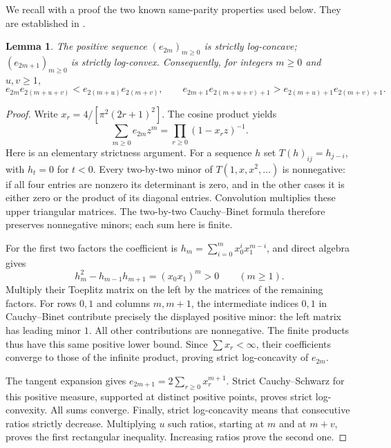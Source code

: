 \documentclass[11pt]{article}
\newtheorem{lemma}{Lemma}
\begin{document}
We recall with a proof the two known same-parity properties used below.
They are established in \cite[Section 3, Proposition 3.2]{Sokal}.
\begin{lemma}\label{same}
The positive sequence $(e_{2m})_{m\ge0}$ is strictly log-concave;
$(e_{2m+1})_{m\ge0}$ is strictly log-convex.
Consequently, for integers $m\ge0$ and $u,v\ge1$,
\[
 e_{2m}e_{2(m+u+v)}<e_{2(m+u)}e_{2(m+v)},\qquad
 e_{2m+1}e_{2(m+u+v)+1}>e_{2(m+u)+1}e_{2(m+v)+1}.
\]
\end{lemma}
\begin{proof}
Write $x_r=4/[\pi^2(2r+1)^2]$. The cosine product yields
\[
 \sum_{m\ge0}e_{2m}z^m=\prod_{r\ge0}(1-x_rz)^{-1}.
\]
Here is an elementary strictness argument. For a sequence $h$ set
$T(h)_{ij}=h_{j-i}$, with $h_t=0$ for $t<0$.
Every two-by-two minor of $T(1,x,x^2,\ldots)$ is nonnegative: if all
four entries are nonzero its determinant is zero, and in the other cases
it is either zero or the product of its diagonal entries.
Convolution multiplies these upper triangular matrices. The two-by-two
Cauchy--Binet formula therefore preserves nonnegative minors; each sum
here is finite.

For the first two factors the coefficient is
$h_m=\sum_{i=0}^m x_0^i x_1^{m-i}$, and direct algebra gives
\[
 h_m^2-h_{m-1}h_{m+1}=(x_0x_1)^m>0\qquad(m\ge1).
\]
Multiply their Toeplitz matrix on the left by the matrices of the
remaining factors. For rows $0,1$ and columns $m,m+1$, the intermediate
indices $0,1$ in Cauchy--Binet contribute precisely the displayed positive
minor: the left matrix has leading minor $1$. All other contributions
are nonnegative. The finite products thus have this same positive lower
bound. Since $\sum x_r<\infty$, their coefficients converge to those of
the infinite product, proving strict log-concavity of $e_{2m}$.

The tangent expansion gives
$e_{2m+1}=2\sum_{r\ge0}x_r^{m+1}$.
Strict Cauchy--Schwarz for this positive measure, supported at distinct
positive points, proves strict log-convexity. All sums converge.
Finally, strict log-concavity means that consecutive ratios strictly
decrease. Multiplying $u$ such ratios, starting at $m$ and at $m+v$,
proves the first rectangular inequality. Increasing ratios prove the
second one.
\end{proof}
\end{document}
